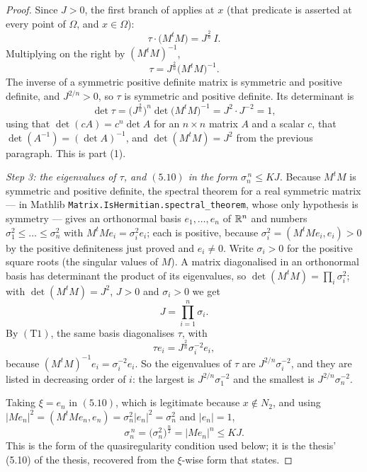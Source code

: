 \begin{proof}
Since $J>0$, the first branch of  applies at $x$
(that predicate is asserted at every point of $\Omega$, and $x\in\Omega$):
\[
\tau\cdot\bigl(M^tM\bigr)=J^{\frac2n}\,I .
\]
Multiplying on the right by $(M^tM)^{-1}$,
\[
\tau=J^{\frac2n}\bigl(M^tM\bigr)^{-1} .
\tag{T1}
\]
The inverse of a symmetric positive definite matrix is symmetric and positive
definite, and $J^{2/n}>0$, so $\tau$ is symmetric and positive definite.  Its
determinant is
\[
\det\tau=\bigl(J^{\frac2n}\bigr)^{n}\det\bigl(M^tM\bigr)^{-1}
=J^{2}\cdot J^{-2}=1 ,
\]
using that $\det(cA)=c^{n}\det A$ for an $n\times n$ matrix $A$ and a scalar
$c$, that $\det(A^{-1})=(\det A)^{-1}$, and $\det(M^tM)=J^2$ from the previous
paragraph.  This is part (1).

\emph{Step 3: the eigenvalues of $\tau$, and $(5.10)$ in the form
$\sigma_n^{\,n}\le KJ$.}  Because $M^tM$ is symmetric and positive definite, the
spectral theorem for a real symmetric matrix --- in Mathlib
\texttt{Matrix.IsHermitian.spectral\_theorem}, whose only hypothesis is
symmetry --- gives an orthonormal basis $e_1,\dots,e_n$ of $\mathbb{R}^n$ and numbers
$\sigma_1^2\le\dots\le\sigma_n^2$ with $M^tMe_i=\sigma_i^2e_i$; each is
positive, because $\sigma_i^2=(M^tMe_i,e_i)>0$ by the positive definiteness just
proved and $e_i\ne0$.  Write $\sigma_i>0$ for the positive square roots (the
singular values of $M$).  A matrix diagonalised in an orthonormal basis has
determinant the product of its eigenvalues, so
$\det(M^tM)=\prod_i\sigma_i^2$; with $\det(M^tM)=J^2$, $J>0$ and
$\sigma_i>0$ we get
\[
J=\prod_{i=1}^n\sigma_i .
\tag{T2}
\]
By $(\mathrm{T1})$, the same basis diagonalises $\tau$, with
\[
\tau e_i=J^{\frac2n}\sigma_i^{-2}e_i ,
\tag{T3}
\]
because $(M^tM)^{-1}e_i=\sigma_i^{-2}e_i$.  So the eigenvalues of $\tau$ are
$J^{2/n}\sigma_i^{-2}$, and they are listed in decreasing order of $i$: the
largest is $J^{2/n}\sigma_1^{-2}$ and the smallest is $J^{2/n}\sigma_n^{-2}$.

Taking $\xi=e_n$ in $(5.10)$, which is legitimate because $x\notin N_2$, and
using $|Me_n|^2=(M^tMe_n,e_n)=\sigma_n^2|e_n|^2=\sigma_n^2$ and $|e_n|=1$,
\[
\sigma_n^{\,n}=\bigl(\sigma_n^2\bigr)^{\frac n2}=|Me_n|^{n}\le KJ .
\tag{5.10$'$}
\]
This is the form of the quasiregularity condition used below; it is the thesis'
(5.10) of the thesis, recovered from the $\xi$-wise form that
 states.


\end{proof}
